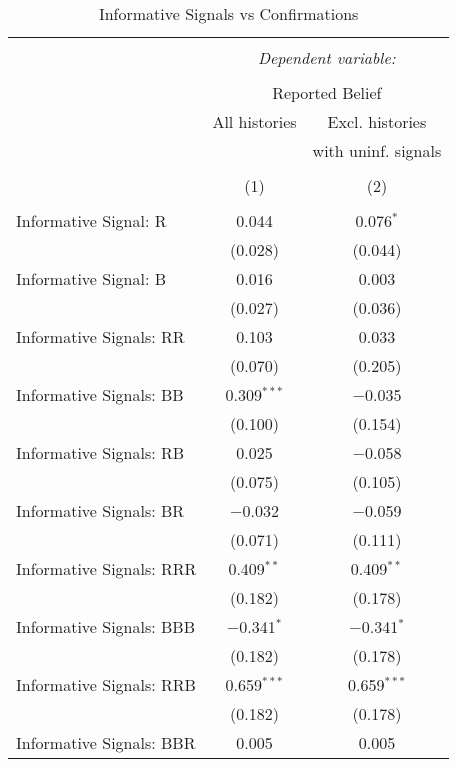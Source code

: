 
\begin{table}[!htbp] \centering \footnotesize
  \caption{Informative Signals vs Confirmations} 
  \label{tab:confirm_vs_informative} 
\begin{tabular}{@{\extracolsep{5pt}}lcc} 
\\[-1.8ex]\hline 
\hline \\[-1.8ex] 
 & \multicolumn{2}{c}{\textit{Dependent variable:}} \\ 
\cline{2-3} 
\\[-1.8ex] & \multicolumn{2}{c}{Reported Belief} \\ 
 & All histories & Excl. histories \\ 
 &  & with uninf. signals \\ 
\\[-1.8ex] & (1) & (2)\\ 
\hline \\[-1.8ex] 
 Informative Signal: R & 0.044 & 0.076$^{*}$ \\ 
  & (0.028) & (0.044) \\ 
  Informative Signal: B & 0.016 & 0.003 \\ 
  & (0.027) & (0.036) \\ 
  Informative Signals: RR & 0.103 & 0.033 \\ 
  & (0.070) & (0.205) \\ 
  Informative Signals: BB & 0.309$^{***}$ & $-$0.035 \\ 
  & (0.100) & (0.154) \\ 
  Informative Signals: RB & 0.025 & $-$0.058 \\ 
  & (0.075) & (0.105) \\ 
  Informative Signals: BR & $-$0.032 & $-$0.059 \\ 
  & (0.071) & (0.111) \\ 
  Informative Signals: RRR & 0.409$^{**}$ & 0.409$^{**}$ \\ 
  & (0.182) & (0.178) \\ 
  Informative Signals: BBB & $-$0.341$^{*}$ & $-$0.341$^{*}$ \\ 
  & (0.182) & (0.178) \\ 
  Informative Signals: RRB & 0.659$^{***}$ & 0.659$^{***}$ \\ 
  & (0.182) & (0.178) \\ 
  Informative Signals: BBR & 0.005 & 0.005 \\ 

\end{tabular}
\end{table}
